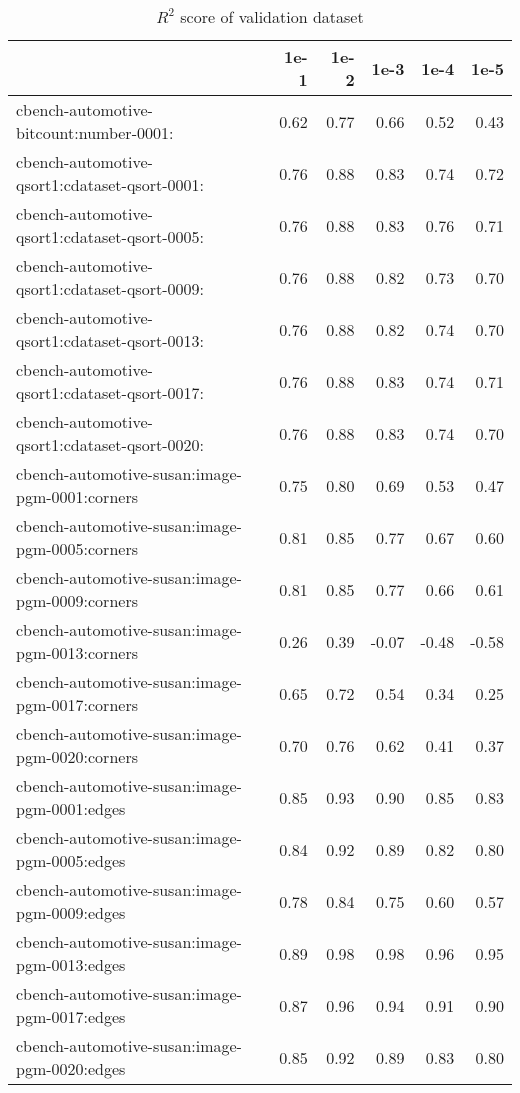 \begin{table}
\caption{$R^2$ score of validation dataset}
\label{table:validate_score}
\begin{tabular}{lrrrrr}
\toprule
 & 1e-1 & 1e-2 & 1e-3 & 1e-4 & 1e-5 \\
\midrule
cbench-automotive-bitcount:number-0001: & 0.62 & 0.77 & 0.66 & 0.52 & 0.43 \\
cbench-automotive-qsort1:cdataset-qsort-0001: & 0.76 & 0.88 & 0.83 & 0.74 & 0.72 \\
cbench-automotive-qsort1:cdataset-qsort-0005: & 0.76 & 0.88 & 0.83 & 0.76 & 0.71 \\
cbench-automotive-qsort1:cdataset-qsort-0009: & 0.76 & 0.88 & 0.82 & 0.73 & 0.70 \\
cbench-automotive-qsort1:cdataset-qsort-0013: & 0.76 & 0.88 & 0.82 & 0.74 & 0.70 \\
cbench-automotive-qsort1:cdataset-qsort-0017: & 0.76 & 0.88 & 0.83 & 0.74 & 0.71 \\
cbench-automotive-qsort1:cdataset-qsort-0020: & 0.76 & 0.88 & 0.83 & 0.74 & 0.70 \\
cbench-automotive-susan:image-pgm-0001:corners & 0.75 & 0.80 & 0.69 & 0.53 & 0.47 \\
cbench-automotive-susan:image-pgm-0005:corners & 0.81 & 0.85 & 0.77 & 0.67 & 0.60 \\
cbench-automotive-susan:image-pgm-0009:corners & 0.81 & 0.85 & 0.77 & 0.66 & 0.61 \\
cbench-automotive-susan:image-pgm-0013:corners & 0.26 & 0.39 & -0.07 & -0.48 & -0.58 \\
cbench-automotive-susan:image-pgm-0017:corners & 0.65 & 0.72 & 0.54 & 0.34 & 0.25 \\
cbench-automotive-susan:image-pgm-0020:corners & 0.70 & 0.76 & 0.62 & 0.41 & 0.37 \\
cbench-automotive-susan:image-pgm-0001:edges & 0.85 & 0.93 & 0.90 & 0.85 & 0.83 \\
cbench-automotive-susan:image-pgm-0005:edges & 0.84 & 0.92 & 0.89 & 0.82 & 0.80 \\
cbench-automotive-susan:image-pgm-0009:edges & 0.78 & 0.84 & 0.75 & 0.60 & 0.57 \\
cbench-automotive-susan:image-pgm-0013:edges & 0.89 & 0.98 & 0.98 & 0.96 & 0.95 \\
cbench-automotive-susan:image-pgm-0017:edges & 0.87 & 0.96 & 0.94 & 0.91 & 0.90 \\
cbench-automotive-susan:image-pgm-0020:edges & 0.85 & 0.92 & 0.89 & 0.83 & 0.80 \\

\end{tabular}
\end{table}
